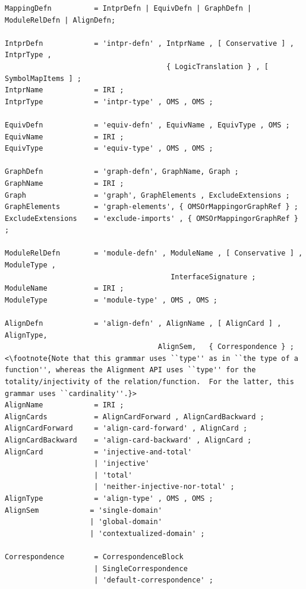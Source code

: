\documentclass[10pt,%
\ifpretendfinal
final%
\else
draft%
\fi,
]{scrreprt}
\begin{document}
\begin{lstlisting}[language=ebnf,escapeinside={<>},mathescape]  % abstract syntax
MappingDefn          = IntprDefn | EquivDefn | GraphDefn | ModuleRelDefn | AlignDefn;

IntprDefn            = 'intpr-defn' , IntprName , [ Conservative ] , IntprType ,
                                      { LogicTranslation } , [ SymbolMapItems ] ;
IntprName            = IRI ;
IntprType            = 'intpr-type' , OMS , OMS ;

EquivDefn            = 'equiv-defn' , EquivName , EquivType , OMS ;
EquivName            = IRI ;
EquivType            = 'equiv-type' , OMS , OMS ;

GraphDefn            = 'graph-defn', GraphName, Graph ;
GraphName            = IRI ;
Graph                = 'graph', GraphElements , ExcludeExtensions ;
GraphElements        = 'graph-elements', { OMSOrMappingorGraphRef } ;
ExcludeExtensions    = 'exclude-imports' , { OMSOrMappingorGraphRef } ; 

ModuleRelDefn        = 'module-defn' , ModuleName , [ Conservative ] , ModuleType ,
                                       InterfaceSignature ;
ModuleName           = IRI ;
ModuleType           = 'module-type' , OMS , OMS ;

AlignDefn            = 'align-defn' , AlignName , [ AlignCard ] , AlignType, 
                                    AlignSem,   { Correspondence } ; <\footnote{Note that this grammar uses ``type'' as in ``the type of a function'', whereas the Alignment API uses ``type'' for the totality/injectivity of the relation/function.  For the latter, this grammar uses ``cardinality''.}>
AlignName            = IRI ;
AlignCards           = AlignCardForward , AlignCardBackward ; 
AlignCardForward     = 'align-card-forward' , AlignCard ;
AlignCardBackward    = 'align-card-backward' , AlignCard ;
AlignCard            = 'injective-and-total'
                     | 'injective'
                     | 'total'
                     | 'neither-injective-nor-total' ;
AlignType            = 'align-type' , OMS , OMS ;
AlignSem            = 'single-domain' 
                    | 'global-domain' 
                    | 'contextualized-domain' ; 

Correspondence       = CorrespondenceBlock
                     | SingleCorrespondence
                     | 'default-correspondence' ; 


\end{lstlisting}
\end{document}
